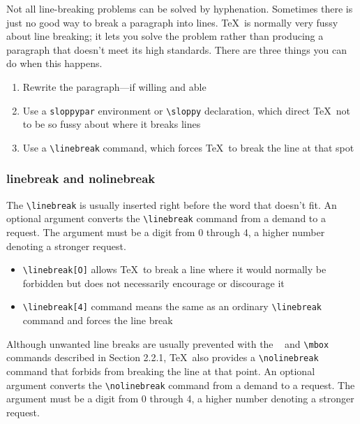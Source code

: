 \documentclass{article}
\newcommand{\justtext}[1]{\texttt{\textbackslash #1}}
\begin{document}
Not all line-breaking problems can be solved by hyphenation. Sometimes there is just no good way to break a paragraph into lines. \TeX\ is normally very fussy about line breaking; it lets you solve the problem rather than producing a paragraph that doesn't meet its high standards. There are three things you can do when this happens.

\begin{enumerate}
   \item Rewrite the paragraph---if willing and able
   \item Use a {\tt sloppypar} environment or \justtext{sloppy} declaration, which direct \TeX\ not
    to be so fussy about where it breaks lines
   \item Use a \justtext{linebreak} command, which forces \TeX\ to break the line at that spot
\end{enumerate}

\subsubsection{linebreak and nolinebreak}

The \justtext{linebreak} is usually inserted right before the word that doesn't fit. An optional argument converts the \justtext{linebreak} command from a demand to a request. The argument must be a digit from 0 through 4, a higher number denoting a stronger request. 

\begin{itemize}
   
   \item \justtext{linebreak[O]} allows \TeX\ to break a line where it would normally be forbidden but does not necessarily encourage or discourage it
   
   \item \justtext{linebreak[4]} command means the same as an ordinary \justtext{linebreak} command and forces the line break
        
\end{itemize}
 
Although unwanted line breaks are usually prevented with the {\tt ~} and \justtext{mbox} commands described in Section 2.2.1, \TeX\ also provides a \justtext{nolinebreak} command that forbids from breaking the line at that point. An optional argument converts the \justtext{nolinebreak} command from a demand to a request. The argument must be a digit from 0 through 4, a higher number denoting a stronger request.
\end{document}
